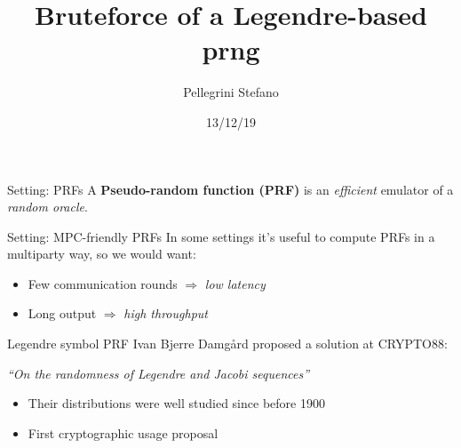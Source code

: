 \documentclass{beamer}
\author{Pellegrini Stefano}
\title{\LARGE Bruteforce of a Legendre-based prng}
\date{13/12/19}
\theoremstyle{definition}
\theoremstyle{remark}
\begin{document}
\maketitle
\begin{frame}{Setting: PRFs}
A \textbf{Pseudo-random function (PRF)} is an \textit{efficient} emulator of a \textit{random oracle}.
\end{frame}

\begin{frame}{Setting: MPC-friendly PRFs}
In some settings it's useful to compute PRFs in a multiparty way, so we would want:
\bigskip
\begin{itemize}
\item Few communication rounds \; $\Rightarrow$ \; \textit{low latency}
\item Long output \; $\Rightarrow$ \; \textit{high throughput}
\end{itemize}
\end{frame}

\begin{frame}{Legendre symbol PRF}
Ivan Bjerre Damg\aa rd proposed a solution at CRYPTO88:
\begin{center}\textit{``On the randomness of Legendre and Jacobi sequences''}\end{center}
\medskip
\begin{itemize}
\item Their distributions were well studied since before 1900
\item First cryptographic usage proposal
\end{itemize}
\end{frame}
\end{document}
